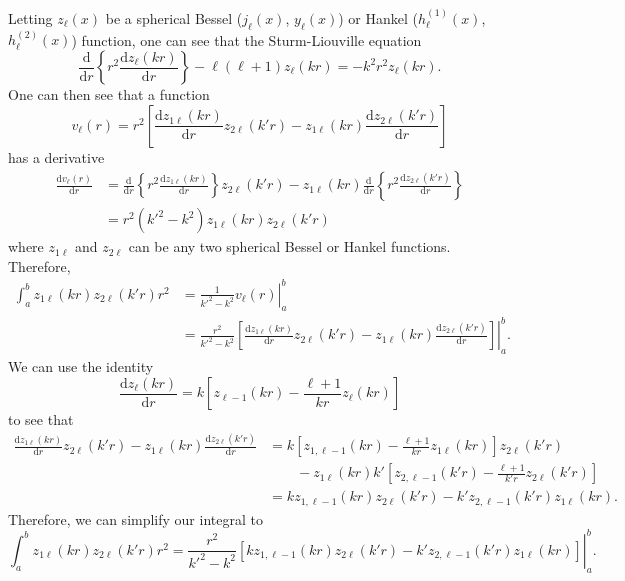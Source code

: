 \documentclass{article}
\begin{document}
Letting $z_\ell(x)$ be a spherical Bessel ($j_\ell(x)$, $y_\ell(x)$) or Hankel ($h_\ell^{(1)}(x)$, $h_\ell^{(2)}(x)$) function, one can see that the Sturm-Liouville equation
\begin{equation}
\frac{\mathrm{d}}{\mathrm{d}r}\left\{r^2\frac{\mathrm{d}z_\ell(kr)}{\mathrm{d}r}\right\} - \ell(\ell + 1)z_\ell(kr) = -k^2r^2z_\ell(kr). 
\end{equation} 
One can then see that a function
\begin{equation}
v_\ell(r) = r^2\left[\frac{\mathrm{d}z_{1\ell}(kr)}{\mathrm{d}r}z_{2\ell}(k'r) - z_{1\ell}(kr)\frac{\mathrm{d}z_{2\ell}(k'r)}{\mathrm{d}r}\right]
\end{equation}
has a derivative
\begin{equation}
\begin{split}
\frac{\mathrm{d}v_\ell(r)}{\mathrm{d}r} &= \frac{\mathrm{d}}{\mathrm{d}r}\left\{r^2\frac{\mathrm{d}z_{1\ell}(kr)}{\mathrm{d}r}\right\}z_{2\ell}(k'r) - z_{1\ell}(kr)\frac{\mathrm{d}}{\mathrm{d}r}\left\{r^2\frac{\mathrm{d}z_{2\ell}(k'r)}{\mathrm{d}r}\right\}\\
&= r^2(k'^2 - k^2)z_{1\ell}(kr)z_{2\ell}(k'r)
\end{split}
\end{equation}
where $z_{1\ell}$ and $z_{2\ell}$ can be any two spherical Bessel or Hankel functions. Therefore,
\begin{equation}
\begin{split}
\int_a^bz_{1\ell}(kr)z_{2\ell}(k'r)r^2 &= \left.\frac{1}{k'^2 - k^2}v_\ell(r)\right|_a^b\\
&= \left.\frac{r^2}{k'^2 - k^2}\left[\frac{\mathrm{d}z_{1\ell}(kr)}{\mathrm{d}r}z_{2\ell}(k'r) - z_{1\ell}(kr)\frac{\mathrm{d}z_{2\ell}(k'r)}{\mathrm{d}r}\right]\right|_a^b.
\end{split}
\end{equation}
We can use the identity 
\begin{equation}
\frac{\mathrm{d}z_\ell(kr)}{\mathrm{d}r} = k\left[z_{\ell-1}(kr) - \frac{\ell + 1}{kr}z_\ell(kr)\right]
\end{equation}
to see that
\begin{equation}
\begin{split}
\frac{\mathrm{d}z_{1\ell}(kr)}{\mathrm{d}r}z_{2\ell}(k'r) - z_{1\ell}(kr)\frac{\mathrm{d}z_{2\ell}(k'r)}{\mathrm{d}r} &= k\left[z_{1,\ell-1}(kr) - \frac{\ell + 1}{kr}z_{1\ell}(kr)\right]z_{2\ell}(k'r)\\
&\qquad- z_{1\ell}(kr)k'\left[z_{2,\ell-1}(k'r) - \frac{\ell + 1}{k'r}z_{2\ell}(k'r)\right]\\[0.5em]
&= kz_{1,\ell-1}(kr)z_{2\ell}(k'r) - k'z_{2,\ell-1}(k'r)z_{1\ell}(kr).
\end{split}
\end{equation}
Therefore, we can simplify our integral to
\begin{equation}
\int_a^bz_{1\ell}(kr)z_{2\ell}(k'r)r^2 = \left.\frac{r^2}{k'^2 - k^2}\left[kz_{1,\ell - 1}(kr)z_{2\ell}(k'r) - k'z_{2,\ell - 1}(k'r)z_{1\ell}(kr)\right]\right|_a^b.
\end{equation}
\end{document}
